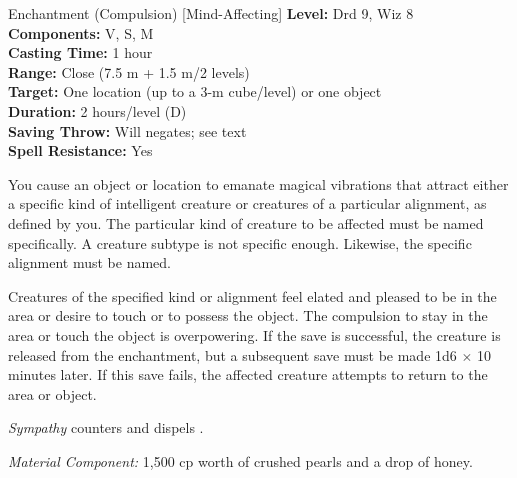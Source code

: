 {Enchantment (Compulsion) [Mind-Affecting]}
{
	\textbf{Level:}
	Drd 9, Wiz 8\\
	\textbf{Components:}
	V, S, M\\
	\textbf{Casting Time:}
	1 hour\\
	\textbf{Range:}
	Close (7.5 m + 1.5 m/2 levels)\\
	\textbf{Target:}
	One location (up to a 3-m cube/level) or one object\\
	\textbf{Duration:}
	2 hours/level (D)\\
	\textbf{Saving Throw:}
	Will negates; see text\\
	\textbf{Spell Resistance:}
	Yes\\
}
{
	You cause an object or location to emanate magical vibrations that attract either a specific kind of intelligent creature or creatures of a particular alignment, as defined by you. The particular kind of creature to be affected must be named specifically. A creature subtype is not specific enough. Likewise, the specific alignment must be named.

	Creatures of the specified kind or alignment feel elated and pleased to be in the area or desire to touch or to possess the object. The compulsion to stay in the area or touch the object is overpowering. If the save is successful, the creature is released from the enchantment, but a subsequent save must be made 1d6 $\times$ 10 minutes later. If this save fails, the affected creature attempts to return to the area or object.

	\emph{Sympathy} counters and dispels .

	\textit{Material Component:}
	1,500 cp worth of crushed pearls and a drop of honey.

}
